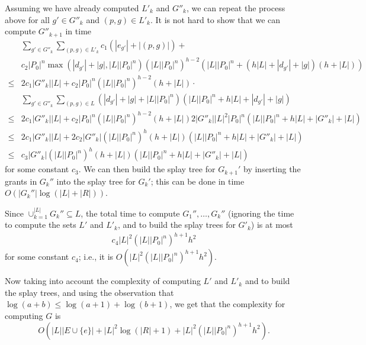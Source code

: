 \documentclass{acmtrans2m}
\newcommand{\<}{
}
\renewcommand{\>}{\rangle}
\newcommand{\union}{\cup}
\newcommand{\len}[1]{|#1|}
\newcommand{\cd}{d}
\newcommand{\cc}{e}
\begin{document}
\begin{sloppypar}
Assuming we have already computed $L'_k$ and $G''_k$, we can repeat the process above for all
$g' \in G''_k$ and $(p,g) \in L'_k$.  It is not hard to show that we can compute $G''_{k+1}$ in time
$$
\begin{array}{ll}
&\sum_{g' \in G''_k} \sum_{(p,g) \in L'_k} c_1(\len{\cc_{g'}} + \len{(p,g)}) +
\\& c_2\len{P_0}^n\max(\len{\cd_{g'}}+\len{g}, \len{L}\len{P_0}^n) (\len{L}\len{P_0}^n)^{h-2}
(\len{L}\len{P_0}^n + (h\len{L} + \len{\cd_{g'}}+\len{g})(h + \len{L}))\\
\le &2c_1\len{G''_{k}}\len{L} + c_2\len{P_0}^n(\len{L}\len{P_0}^n)^{h-2}(h + \len{L}) \cdot\\
& \sum_{g' \in G''_k} \sum_{(p,g) \in L} (\len{\cd_{g'}}+\len{g} + \len{L}\len{P_0}^n)
(\len{L}\len{P_0}^n + h\len{L} + \len{\cd_{g'}}+\len{g})\\
\le &2c_1\len{G''_{k}}\len{L} + c_2\len{P_0}^n(\len{L}\len{P_0}^n)^{h-2}(h + \len{L})
2\len{G''_k}\len{L}^2 \len{P_0}^n(\len{L}\len{P_0}^n + h \len{L} + \len{G''_k} + \len{L})\\
\le &2c_1\len{G''_{k}}\len{L} + 2c_2\len{G''_{k}}(\len{L}\len{P_0}^n)^h(h + \len{L})
(\len{L}\len{P_0}^n + h \len{L} + \len{G''_k} + \len{L})\\
\le &c_3 \len{G''_{k}}(\len{L}\len{P_0}^n)^h(h + \len{L})(\len{L}\len{P_0}^n + h \len{L} +
\len{G''_k} + \len{L})
\end{array}
$$
for some constant $c_3$.  We can then build the splay tree for $G_{k+1}'$ by inserting the grants
in $G_k''$ into the splay tree for $G_{k}'$; this can be done in time
$O(\len{G_k''} \log(\len{L} + \len{R}))$.

Since $\union_{k=1}^{\len{L}} G_k'' \subseteq L$, the total time to compute $G_1'', \ldots, G_k''$
(ignoring the time to compute the sets $L'$ and $L'_k$, and to build the splay trees for $G'_k$) is
at most
$$
\begin{array}{ll}
c_4\len{L}^2(\len{L}\len{P_0}^n)^{h+1}h^2
\end{array}
$$
for some constant $c_4$; i.e., it is $O(\len{L}^2(\len{L}\len{P_0}^n)^{h+1}h^2)$.

Now taking into account the complexity of computing $L'$ and $L'_k$ and to build the splay trees, and
using the observation that $\log(a+b) \le \log(a+1) + \log(b+1)$, we get that the complexity for
computing $G$ is
$$
O(\len{L}\len{E\union\{\cc\}} + \len{L}^2\log(\len{R} + 1) + \len{L}^2(\len{L}\len{P_0}^n)^{h+1}h^2).
$$


\end{sloppypar}
\end{document}
